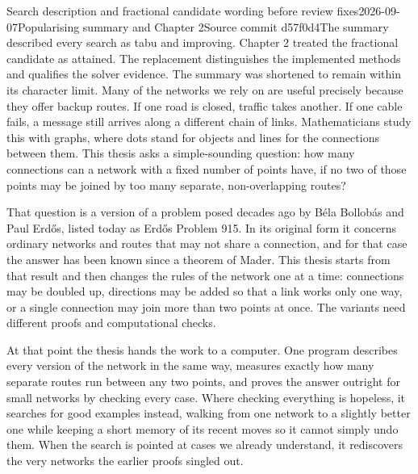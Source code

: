 \begin{offcut}{Search description and fractional candidate wording before review fixes}{2026-09-07}{Popularising summary and Chapter 2}{Source commit d57f0d4}{The summary described every search as tabu and improving. Chapter 2 treated the fractional candidate as attained. The replacement distinguishes the implemented methods and qualifies the solver evidence. The summary was shortened to remain within its character limit.}
Many of the networks we rely on are useful precisely because they offer backup routes. If one road is closed, traffic takes another. If one cable fails, a message still arrives along a different chain of links. Mathematicians study this with graphs, where dots stand for objects and lines for the connections between them. This thesis asks a simple-sounding question: how many connections can a network with a fixed number of points have, if no two of those points may be joined by too many separate, non-overlapping routes?

That question is a version of a problem posed decades ago by B\'{e}la Bollob\'{a}s and Paul Erd\H{o}s, listed today as Erd\H{o}s Problem 915. In its original form it concerns ordinary networks and routes that may not share a connection, and for that case the answer has been known since a theorem of Mader. This thesis starts from that result and then changes the rules of the network one at a time: connections may be doubled up, directions may be added so that a link works only one way, or a single connection may join more than two points at once. The variants need different proofs and computational checks.

At that point the thesis hands the work to a computer. One program describes every version of the network in the same way, measures exactly how many separate routes run between any two points, and proves the answer outright for small networks by checking every case. Where checking everything is hopeless, it searches for good examples instead, walking from one network to a slightly better one while keeping a short memory of its recent moves so it cannot simply undo them. When the search is pointed at cases we already understand, it rediscovers the very networks the earlier proofs singled out.


\end{offcut}
